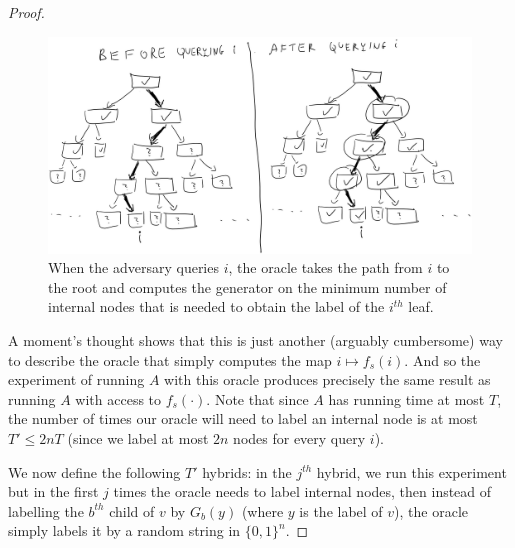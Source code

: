\begin{proof}
\begin{figure}
\centering
\includegraphics[width=\textwidth, height=0.25\paperheight, keepaspectratio]{../figure/prf-oracle-step.jpg}
\caption{When the adversary queries \(i\), the oracle takes the path
from \(i\) to the root and computes the generator on the minimum number
of internal nodes that is needed to obtain the label of the \(i^{th}\)
leaf.}
\label{oracleevaltreefig}
\end{figure}

A moment's thought shows that this is just another (arguably cumbersome)
way to describe the oracle that simply computes the map
\(i\mapsto f_s(i)\). And so the experiment of running \(A\) with this
oracle produces precisely the same result as running \(A\) with access
to \(f_s(\cdot)\). Note that since \(A\) has running time at most \(T\),
the number of times our oracle will need to label an internal node is at
most \(T' \leq 2nT\) (since we label at most \(2n\) nodes for every
query \(i\)).

We now define the following \(T'\) hybrids: in the \(j^{th}\) hybrid, we
run this experiment but in the first \(j\) times the oracle needs to
label internal nodes, then instead of labelling the \(b^{th}\) child of
\(v\) by \(G_b(y)\) (where \(y\) is the label of \(v\)), the oracle
simply labels it by a random string in \(\{0,1\}^n\).


\end{proof}
